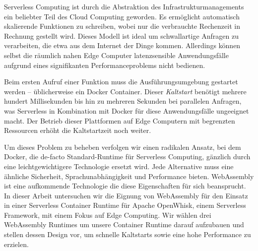 \documentclass[draft, final, x11names, svgnames]{template/vutinfth} %
\begin{document}
\frontmatter %

\addstatementpage

\begin{danksagung*}
\end{danksagung*}

\begin{acknowledgements*}
\end{acknowledgements*}

\begin{kurzfassung}

Serverless Computing ist durch die Abstraktion des Infrastrukturmanagements ein beliebter Teil des Cloud Computing geworden. Es ermöglicht automatisch skalierende Funktionen zu schreiben, wobei nur die verbrauchte Rechenzeit in Rechnung gestellt wird. Dieses Modell ist ideal um schwallartige Anfragen zu verarbeiten, die etwa aus dem Internet der Dinge kommen. Allerdings können selbst die räumlich nahen Edge Computer latenzsensible Anwendungsfälle aufgrund eines signifikanten Performanceproblems nicht bedienen.

Beim ersten Aufruf einer Funktion muss die Ausführungsumgebung gestartet werden -- üblicherweise ein Docker Container. Dieser \emph{Kaltstart} benötigt mehrere hundert Millisekunden bis hin zu mehreren Sekunden bei parallelen Anfragen, was Serverless in Kombination mit Docker für diese Anwendungsfälle ungeeignet macht. Der Betrieb dieser Plattformen auf Edge Computern mit begrenzten Ressourcen erhöht die Kaltstartzeit noch weiter.

Um dieses Problem zu beheben verfolgen wir einen radikalen Ansatz, bei dem Docker, die de-facto Standard-Runtime für Serverless Computing, gänzlich durch eine leichtgewichtigere Technologie ersetzt wird. Jede Alternative muss eine ähnliche Sicherheit, Sprachunabhängigkeit und Performance bieten. WebAssembly ist eine aufkommende Technologie die diese Eigenschaften für sich beansprucht. In dieser Arbeit untersuchen wir die Eignung von WebAssembly für den Einsatz in einer Serverless Container Runtime für Apache OpenWhisk, einem Serverless Framework, mit einem Fokus auf Edge Computing. Wir wählen drei WebAssembly Runtimes um unsere Container Runtime darauf aufzubauen und stellen dessen Design vor, um schnelle Kaltstarts sowie eine hohe Performance zu erzielen.


\end{kurzfassung}
\end{document}
